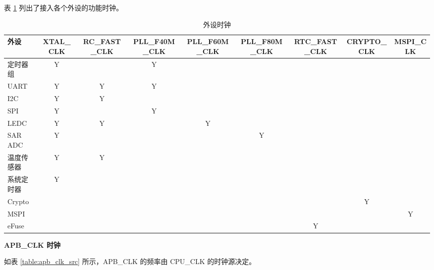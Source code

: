 \documentclass[main\_\_CN.tex]{subfiles}
\begin{document}
表 \ref{tab:resclk-periph-clks} 列出了接入各个外设的功能时钟。


\begin{landscape}
\begin{longtable}[c]{|p{2.5cm}|c|c|c|c|c|c|c|c| }
 \caption{外设时钟}
    \label{tab:resclk-periph-clks} \\
  \hline
    \rowcolor{lightgray}

        \textbf{外设} & \textbf{XTAL\_CLK} & \textbf{RC\_FAST\_CLK} & \textbf{PLL\_F40M\_CLK} & \textbf{PLL\_F60M\_CLK} & \textbf{PLL\_F80M\_CLK} & \textbf{RTC\_FAST\_CLK} & \textbf{CRYPTO\_CLK} & \textbf{MSPI\_CLK} \\\hline
        定时器组       & Y &   & Y &   &   &   &   &   \\
        \hline
        UART       & Y & Y & Y &   &   &   &   &   \\
        \hline
        I2C        & Y & Y &   &   &   &   &   &   \\
        \hline
        SPI        & Y &   & Y &   &   &   &   &   \\
        \hline
        LEDC       & Y & Y &   & Y &   &   &   &   \\
        \hline
        SAR ADC     & Y &   &   &   & Y &   &   &   \\
        \hline
        温度传感器    & Y & Y &   &   &   &   &   &   \\
        \hline
        系统定时器 & Y &   &   &   &   &   &   &   \\
        \hline
        Crypto     &   &   &   &   &   &   & Y &   \\
        \hline
        MSPI       &   &   &   &   &   &   &   & Y \\
        \hline
        eFuse      &   &   &   &   &   & Y &   &   \\
        \hline
\end{longtable}
\end{landscape}

\textbf{APB\_CLK 时钟}

如表 \ref{table:apb_clk_src} 所示，APB\_CLK 的频率由 CPU\_CLK 的时钟源决定。
\end{document}
